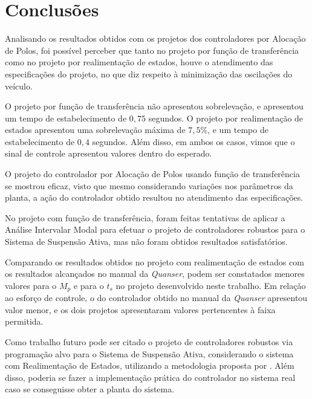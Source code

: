 \documentclass[journal,brazil,english]{IEEEtran}
\begin{document}
\section{Conclusões}\label{conclusao}
Analisando os resultados obtidos com os projetos dos controladores por Alocação de Polos, foi possível perceber que tanto no projeto por função de transferência como no projeto por realimentação de estados, houve o atendimento das especificações do projeto, no que diz respeito à minimização das oscilações do veículo.

O projeto por função de transferência não apresentou sobrelevação, e apresentou um tempo de estabelecimento de $0,75$ segundos. O projeto por realimentação de estados apresentou uma sobrelevação máxima de $7,5$\%, e um tempo de estabelecimento de $0,4$ segundos. Além disso, em ambos os casos, vimos que o sinal de controle apresentou valores dentro do esperado.

O projeto do controlador por Alocação de Polos usando função de transferência se mostrou eficaz, visto que mesmo considerando variações nos parâmetros da planta, a ação do controlador obtido resultou no atendimento das especificações.

No projeto com função de transferência, foram feitas tentativas de aplicar a Análise Intervalar Modal \cite{modal} para efetuar o projeto de controladores robustos \cite{prado2008controle} para o Sistema de Suspensão Ativa, mas não foram obtidos resultados satisfatórios.

Comparando os resultados obtidos no projeto com realimentação de estados com os resultados alcançados no manual da \textit{Quanser}, podem ser constatados menores valores para o $M_p$ e para o $t_s$ no projeto desenvolvido neste trabalho. Em relação ao esforço de controle, o do controlador obtido no manual da \textit{Quanser} apresentou valor menor, e os dois projetos apresentaram valores pertencentes à faixa permitida.

Como  trabalho  futuro pode ser citado o projeto de controladores robustos via programação alvo para o Sistema de Suspensão Ativa, considerando o sistema com Realimentação de Estados, utilizando a metodologia proposta por \cite{lordelo}. Além disso, poderia se fazer a implementação prática do controlador no sistema real caso se conseguisse obter a planta do sistema.

\onecolumn
{}\label{apendice}
\end{document}
